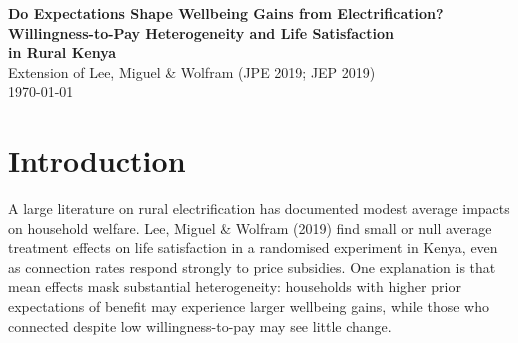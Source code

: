 \documentclass[letter,12pt]{article}
\begin{document}
\begin{titlepage}
\begin{center}
\vspace*{2cm}
{\Large \textbf{Do Expectations Shape Wellbeing Gains from Electrification?\\
Willingness-to-Pay Heterogeneity and Life Satisfaction\\
in Rural Kenya}}\\[2em]
{\large Extension of Lee, Miguel \& Wolfram (JPE 2019; JEP 2019)}\\[2em]
{\normalsize \today}\\[6em]

\begin{abstract}
\noindent
This paper asks whether baseline willingness-to-pay (WTP) for a grid electricity
connection predicts the life satisfaction gains from electrification. Using data
from a randomised experiment in rural Kenya, we merge stated WTP elicited at
baseline (2014) with subjective wellbeing outcomes measured at two follow-up
rounds (2016, 2017). We estimate heterogeneous treatment-on-treated (TOT)
effects on a life satisfaction index and a mental health symptoms index,
using the three experimental subsidy arms as instruments and WTP as the
interaction variable, mirroring the specification of Lee, Miguel \& Wolfram
(2019). We also examine whether, conditional on connecting, realised life
satisfaction scales with stated WTP. Our findings speak to the role of
prior expectations in shaping welfare responses to household electrification.
\end{abstract}
\end{center}
\end{titlepage}

\section{Introduction}

A large literature on rural electrification has documented modest average
impacts on household welfare. Lee, Miguel \& Wolfram (2019) find small or
null average treatment effects on life satisfaction in a randomised experiment
in Kenya, even as connection rates respond strongly to price subsidies. One
explanation is that mean effects mask substantial heterogeneity: households
with higher prior expectations of benefit may experience larger wellbeing
gains, while those who connected despite low willingness-to-pay may see
little change.
\end{document}
